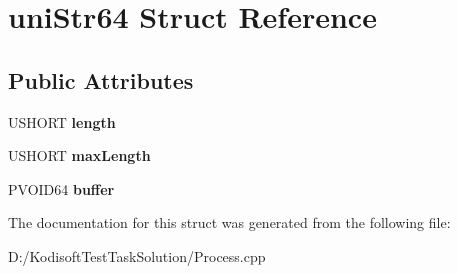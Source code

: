 \hypertarget{structuni_str64}{\section{uni\+Str64 Struct Reference}
\label{structuni_str64}
}
\subsection*{Public Attributes}
\begin{DoxyCompactItemize}
\item 
\hypertarget{structuni_str64_a12d38ff60c41a0cb32dd8bc42f12686a}{U\+S\+H\+O\+R\+T {\bfseries length}}\label{structuni_str64_a12d38ff60c41a0cb32dd8bc42f12686a}

\item 
\hypertarget{structuni_str64_af7e838333227ad51fe55faa177822860}{U\+S\+H\+O\+R\+T {\bfseries max\+Length}}\label{structuni_str64_af7e838333227ad51fe55faa177822860}

\item 
\hypertarget{structuni_str64_ac85d4eab6210d61c34447a211213b947}{P\+V\+O\+I\+D64 {\bfseries buffer}}\label{structuni_str64_ac85d4eab6210d61c34447a211213b947}

\end{DoxyCompactItemize}


The documentation for this struct was generated from the following file\+:\begin{DoxyCompactItemize}
\item 
D\+:/\+Kodisoft\+Test\+Task\+Solution/Process.\+cpp\end{DoxyCompactItemize}
